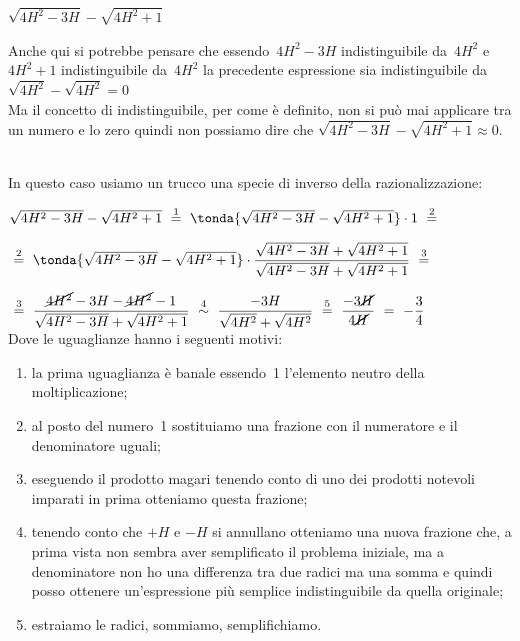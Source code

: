 \begin{esempio}
\(\sqrt{4H^2 -3H} - \sqrt{4H^2 +1}\)

\begin{osservazione}
 Anche qui si potrebbe pensare che essendo~\(4H^2 -3H\) indistinguibile 
da~\(4H^2\) e~\(4H^2 +1\) indistinguibile da~\(4H^2\) la precedente 
espressione sia indistinguibile da \\
\(\sqrt{4H^2} - \sqrt{4H^2} = 0\)\\
Ma il concetto di indistinguibile, per come è definito, non si può mai 
applicare tra un numero e lo zero quindi non possiamo dire che 
\(\sqrt{4H^2 -3H} - \sqrt{4H^2 +1} \approx 0\).
\end{osservazione}\\

In questo caso usiamo un trucco una specie di inverso della 
razionalizzazione:

\(\sqrt{4H^2 -3H} - \sqrt{4H^2 +1}
~ \stackrel{1}{=} ~
   \tonda{\sqrt{4H^2 -3H} - \sqrt{4H^2 +1}} \cdot 1 
~ \stackrel{2}{=} ~\)

\(~ \stackrel{2}{=} ~\tonda{\sqrt{4H^2 -3H}-\sqrt{4H^2 +1}} \cdot 
   \dfrac{\sqrt{4H^2 -3H}+\sqrt{4H^2 +1}}{\sqrt{4H^2 -3H}+\sqrt{4H^2+1}}
~ \stackrel{3}{=} ~\)

\(~ \stackrel{3}{=} ~
   \dfrac{\cancel{4H^2} -3H - \cancel{4H^2} -1}
         {\sqrt{4H^2 -3H}+\sqrt{4H^2+1}}
~ \stackrel{4}{\sim} ~
   \dfrac{-3H}{\sqrt{4H^2} + \sqrt{4H^2}}
~ \stackrel{5}{=} ~
   \dfrac{-3\cancel{H}}{4\cancel{H}}
~ \stackrel{}{=} ~
   -\dfrac{3}{4}\)\\

Dove le uguaglianze hanno i seguenti motivi:
\begin{enumerate} [nosep]
 \item la prima uguaglianza è banale essendo~1 l'elemento 
neutro della moltiplicazione; 
 \item al posto del numero~1 sostituiamo una frazione con 
il numeratore e il denominatore uguali; 
 \item eseguendo il prodotto magari tenendo conto di uno 
dei prodotti notevoli imparati in prima otteniamo questa 
frazione;
 \item tenendo conto che \(+H\) e \(-H\) si annullano 
otteniamo una nuova frazione che, a prima vista non sembra 
aver semplificato il problema iniziale, 
ma a denominatore non ho una differenza tra due radici 
ma una somma e quindi posso ottenere un'espressione più semplice 
indistinguibile da quella originale;
 \item estraiamo le radici, sommiamo, semplifichiamo.
\end{enumerate}
\end{esempio}



